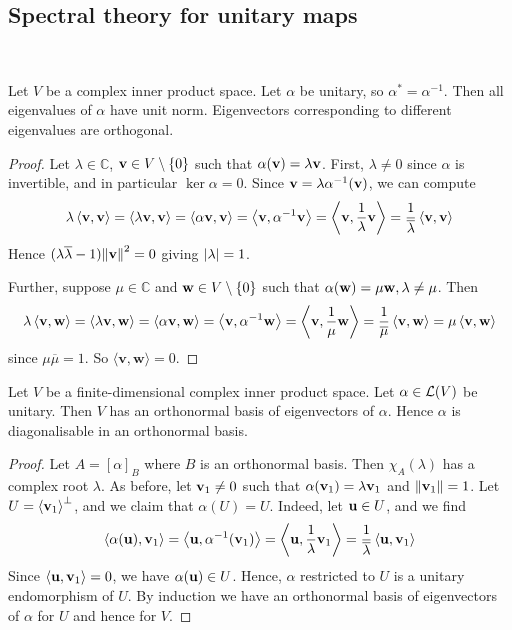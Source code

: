 \documentclass[a4paper,11pt]{article}
\begin{document}
\subsection{Spectral theory for unitary maps}
\ \vspace*{-1.5em}
\begin{lemma}
	Let \( V \) be a complex inner product space.
	Let \( \alpha \) be unitary, so \( \alpha^* = \alpha^{-1} \).
	Then all eigenvalues of \( \alpha \) have unit norm.
	Eigenvectors corresponding to different eigenvalues are orthogonal.
\end{lemma}
\begin{proof}
	Let \( \lambda \in \mathbb C \), \( {\bf v} \in V \setminus \qty{0} \) such that \( \alpha({\bf v}) = \lambda {\bf v} \).
	First, \( \lambda \neq 0 \) since \( \alpha \) is invertible, and in particular \( \ker \alpha = \qty{0} \).
	Since \( {\bf v} = \lambda \alpha^{-1}({\bf v}) \), we can compute
	\[
		\lambda \left\langle{{\bf v},{\bf v}}\right\rangle = \left\langle{\lambda {\bf v}, {\bf v}}\right\rangle = \left\langle{\alpha {\bf v}, {\bf v}}\right\rangle = \left\langle{{\bf v}, \alpha^{-1} {\bf v}}\right\rangle = \left\langle{{\bf v}, \frac{1}{\lambda} {\bf v}}\right\rangle = \frac{1}{\overline \lambda} \left\langle{{\bf v}, {\bf v}}\right\rangle
	\]
	Hence \( (\lambda \overline \lambda - 1) \norm{{\bf v}}^2 = 0 \) giving \( \abs{\lambda} = 1 \).

	Further, suppose \( \mu \in \mathbb C \) and \( {\bf w} \in V \setminus \qty{0} \) such that \( \alpha({\bf w}) = \mu {\bf w}, \lambda \neq \mu \).
	Then
	\[
		\lambda \left\langle{{\bf v},{\bf w}}\right\rangle = \left\langle{\lambda {\bf v}, {\bf w}}\right\rangle = \left\langle{\alpha {\bf v}, {\bf w}}\right\rangle = \left\langle{{\bf v}, \alpha^{-1} {\bf w}}\right\rangle = \left\langle{{\bf v}, \frac{1}{\mu} {\bf w}}\right\rangle = \frac{1}{\overline \mu} \left\langle{{\bf v},{\bf w}}\right\rangle = \mu \left\langle{{\bf v},{\bf w}}\right\rangle
	\]
	since \( \mu \overline \mu = 1 \). So $ \langle \mathbf{v},\mathbf{w} \rangle = 0 $.
\end{proof}
\begin{theorem}
	Let \( V \) be a finite-dimensional complex inner product space.
	Let \( \alpha \in {\mathcal{L}}(V) \) be unitary.
	Then \( V \) has an orthonormal basis of eigenvectors of \( \alpha \).
	Hence \( \alpha \) is diagonalisable in an orthonormal basis.
\end{theorem}
\begin{proof}
	Let \( A = [\alpha]_B \) where \( B \) is an orthonormal basis.
	Then \( \chi_A(\lambda) \) has a complex root \( \lambda \).
	As before, let \( {\bf v}_1 \neq 0 \) such that \( \alpha({\bf v}_1) = \lambda {\bf v}_1 \) and \(\norm{{\bf v}_1} = 1 \).
	Let \( U = \left\langle{} {\bf v}_1 \right\rangle^\perp \), and we claim that \( \alpha(U) = U \).
	Indeed, let \( {\bf u} \in U \), and we find
	\[
		\left\langle{\alpha({\bf u}), {\bf v}_1}\right\rangle = \left\langle{{\bf u}, \alpha^{-1}({\bf v}_1)}\right\rangle = \left\langle{{\bf u}, \frac{1}{\lambda} {\bf v}_1}\right\rangle = \frac{1}{\overline \lambda} \left\langle{{\bf u},{\bf v}_1}\right\rangle
	\]
	Since \( \left\langle{{\bf u}, {\bf v}_1}\right\rangle = 0 \), we have \( \alpha({\bf u}) \in U \).
	Hence, \( \alpha \) restricted to \( U \) is a unitary endomorphism of \( U \).
	By induction we have an orthonormal basis of eigenvectors of \( \alpha \) for \( U \) and hence for \( V \).
\end{proof}
\end{document}
